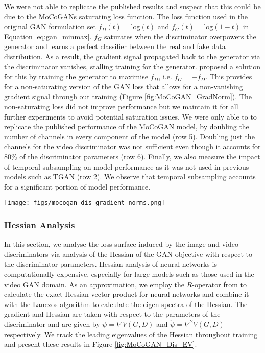 \documentclass[a4paper,fleqn]{cas-sc}
\begin{document}
We were not able to replicate the published results and suspect that this could be due to the MoCoGANs saturating loss function. The loss function used in the original GAN formulation set $f_D(t) = \text{log}(t)$ and $f_G(t) = \text{log}(1 - t)$ in Equation \ref{eq:gan_minmax}. $f_G$ saturates when the discriminator overpowers the generator and learns a perfect classifier between the real and fake data distribution. As a result, the gradient signal propagated back to the generator via the discriminator vanishes, stalling training for the generator. \citet{GoodfellowPMXWOCB14generative} proposed a solution for this by training the generator to maximise $f_D$, i.e. $f_G = -f_D$. This provides for a non-saturating version of the GAN loss that allows for a non-vanishing gradient signal through out training (Figure \ref{fig:MoCoGAN_GradNorm}). The non-saturating loss did not improve performance but we maintain it for all further experiments to avoid potential saturation issues. We were only able to to replicate the published performance of the MoCoGAN model, by doubling the number of channels in every component of the model (row 5). Doubling just the channels for the video discriminator was not sufficient even though it accounts for 80\% of the discriminator parameters (row 6). Finally, we also measure the impact of temporal subsampling on model performance as it was not used in previous models such as TGAN (row 2). We observe that temporal subsampling accounts for a significant portion of model performance.  


\begin{figure*}
    \centering
    \texttt{[image: figs/mocogan\_dis\_gradient\_norms.png]}
    \caption{Norm of the gradient at each node in the computation graph for batches of real and fake data.} 
    \label{fig:MoCoGAN_GradNorm}
\end{figure*}


\subsubsection{Hessian Analysis}
\label{sec:hess}

In this section, we analyse the loss surface induced by the image and video discriminators via analysis of the Hessian of the
GAN objective with respect to the discriminator parameters. Hessian analysis of neural networks is computationally expensive, especially for large models such as those used in the video GAN domain. As an approximation, we employ the $R$-operator from \citet{Pearlmutter94hess} to calculate the exact Hessian vector product for neural networks and combine it with the Lanczos algorithm to calculate the eigen spectra of the Hessian. The gradient and Hessian are taken with respect to the parameters of the discriminator and are given by
$\dot{\psi}  = \nabla V(G, D)$ and $ \ddot{\psi}  = \nabla^2 V(G, D) 
$ respectively. We track the leading eigenvalues of the Hessian throughout training and present these results in Figure \ref{fig:MoCoGAN_Dis_EV}. 
\end{document}
